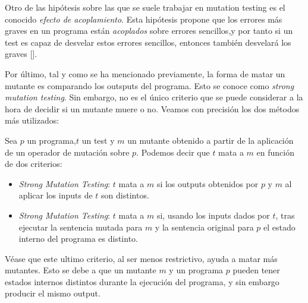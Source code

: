 Otro de las hipótesis sobre las que se suele trabajar en mutation testing es el conocido \textit{efecto de acoplamiento}. Esta hipótesis propone que los errores más graves en un programa están \textit{acoplados} sobre errores sencillos,y por tanto si un test es capaz de desvelar estos errores sencillos, entonces también desvelará los graves [\cite{offutt1992investigations}].

Por último, tal y como se ha mencionado previamente, la forma de matar un mutante es comparando los outsputs del programa. Esto se conoce como \textit{strong mutation testing}. Sin embargo, no es el único criterio que se puede considerar a la hora de decidir si un mutante muere o no. Veamos con precisión los dos métodos más utilizados:

\begin{definition}
Sea $p$ un programa,$t$ un test y $m$ un mutante obtenido a partir de la aplicación de un operador de mutación sobre $p$. Podemos decir que $t$ mata a $m$ en función de dos criterios:
\begin{itemize}
\item \emph{Strong Mutation Testing}: $t$ mata a $m$ si los outputs obtenidos por $p$ y $m$ al aplicar los inputs de $t$ son distintos.
\item \emph{Strong Mutation Testing}: $t$ mata a $m$ si, usando los inputs dados por $t$,  tras ejecutar la sentencia mutada para $m$ y la sentencia original para $p$ el estado interno del programa es distinto. 
\end{itemize}
\end{definition}

Véase que este ultimo criterio, al ser menos restrictivo, ayuda a matar más mutantes. Esto se debe a que un mutante $m$ y un programa $p$ pueden tener estados internos distintos durante la ejecución del programa, y sin embargo producir el mismo output. 

